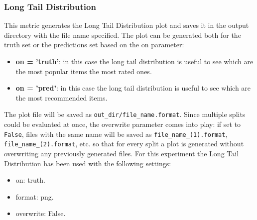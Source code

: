 \documentclass[11pt]{article}
\begin{document}

\subsubsection{Long Tail Distribution}\label{subsubsec:ltd}
This metric generates the Long Tail Distribution plot and saves it in the output directory with the file name
specified.
The plot can be generated both for the truth set or the predictions set based on the on parameter:
\begin{itemize}
    \item \textbf{on = 'truth'}: in this case the long tail distribution is useful to see which are the most popular items
       the most rated ones.
    \item \textbf{on = 'pred'}: in this case the long tail distribution is useful to see which are the most recommended
        items.
\end{itemize}
\hfill\break
\hfill\break
The plot file will be saved as \texttt{out\_dir/file\_name.format}.
Since multiple splits could be evaluated at once, the overwrite parameter comes into play:
if set to \texttt{False}, files with the same name will be saved as \texttt{file\_name\_(1).format}, \texttt{file\_name\_(2).format}, etc.
so that for every split a plot is generated without overwriting any previously generated files.
\hfill\break
\hfill\break
For this experiment the Long Tail Distribution has been used with the following settings:
\begin{itemize}
    \item on: truth.
    \item format: png.
    \item overwrite: False.
\end{itemize}
\hfill\break
\hfill\break


\end{document}
